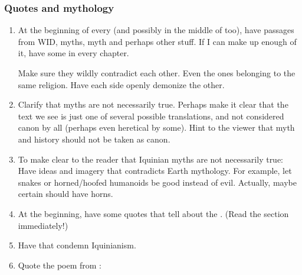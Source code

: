 \subsubsection{Quotes and mythology}
\begin{enumerate}
  \item 
    At the beginning of every  (and possibly in the middle of  too), have passages from WID, \Iquinian myths, \Ortaican myth and perhaps other stuff.
    If I can make up enough of it, have some in every chapter.
    
    Make sure they wildly contradict each other.
    Even the ones belonging to the same religion.
    Have each side openly demonize the other. 
    
  \item 
    Clarify that myths are not necessarily true. 
    Perhaps make it clear that the text we see is just one of several possible translations, and not considered canon by all (perhaps even heretical by some).
    Hint to the viewer that myth and history should not be taken as canon. 

  \item 
    To make clear to the reader that Iquinian myths are not necessarily true: 
    Have ideas and imagery that contradicts Earth mythology. 
    For example, let snakes or horned/hoofed humanoids be good instead of evil. 
    Actually, maybe certain \resphain should have horns. 
    
  \item 
    At the beginning, have some quotes that tell about the . 
    (Read the section immediately!)
    
  \item 
    Have \Ortaican {} that condemn Iquinianism. 
  
  \item 
    Quote the poem  from \cite{KarlEdwardWagner:DarknessWeaves}:
    
\end{enumerate}






